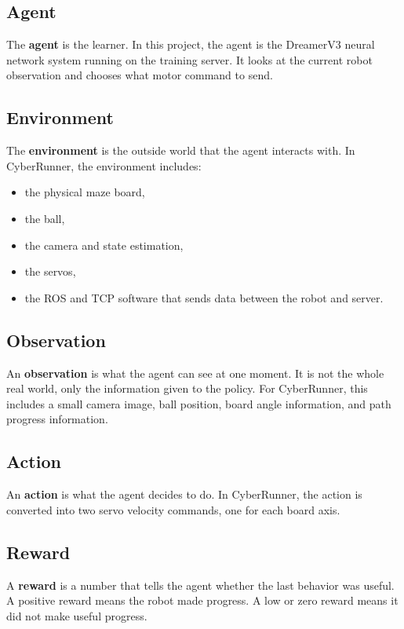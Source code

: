 \documentclass[11pt]{article}
\begin{document}
\subsection{Agent}

The \textbf{agent} is the learner. In this project, the agent is the DreamerV3 neural network system running on the training server. It looks at the current robot observation and chooses what motor command to send.

\subsection{Environment}

The \textbf{environment} is the outside world that the agent interacts with. In CyberRunner, the environment includes:

\begin{itemize}[leftmargin=*]
  \item the physical maze board,
  \item the ball,
  \item the camera and state estimation,
  \item the servos,
  \item the ROS and TCP software that sends data between the robot and server.
\end{itemize}

\subsection{Observation}

An \textbf{observation} is what the agent can see at one moment. It is not the whole real world, only the information given to the policy. For CyberRunner, this includes a small camera image, ball position, board angle information, and path progress information.

\subsection{Action}

An \textbf{action} is what the agent decides to do. In CyberRunner, the action is converted into two servo velocity commands, one for each board axis.

\subsection{Reward}

A \textbf{reward} is a number that tells the agent whether the last behavior was useful. A positive reward means the robot made progress. A low or zero reward means it did not make useful progress.
\end{document}
